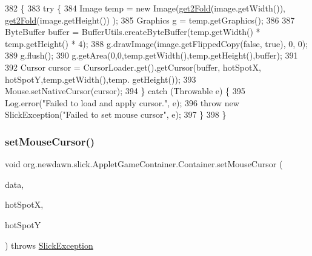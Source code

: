 \begin{DoxyCode}
382                                                                                                 \{
383           \textcolor{keywordflow}{try} \{
384              Image temp = \textcolor{keyword}{new} Image(\mbox{\hyperlink{classorg_1_1newdawn_1_1slick_1_1_applet_game_container_1_1_container_a012fbf7d500ad28d0dccfd9606f0cc1f}{get2Fold}}(image.getWidth()), \mbox{\hyperlink{classorg_1_1newdawn_1_1slick_1_1_applet_game_container_1_1_container_a012fbf7d500ad28d0dccfd9606f0cc1f}{get2Fold}}(image.getHeight())
      );
385              Graphics g = temp.getGraphics();
386              
387              ByteBuffer buffer = BufferUtils.createByteBuffer(temp.getWidth() * temp.getHeight() * 4);
388              g.drawImage(image.getFlippedCopy(\textcolor{keyword}{false}, \textcolor{keyword}{true}), 0, 0);
389              g.flush();
390              g.getArea(0,0,temp.getWidth(),temp.getHeight(),buffer);
391              
392              Cursor cursor = CursorLoader.get().getCursor(buffer, hotSpotX, hotSpotY,temp.getWidth(),temp.
      getHeight());
393              Mouse.setNativeCursor(cursor);
394           \} \textcolor{keywordflow}{catch} (Throwable e) \{
395              Log.error(\textcolor{stringliteral}{"Failed to load and apply cursor."}, e);
396              \textcolor{keywordflow}{throw} \textcolor{keyword}{new} SlickException(\textcolor{stringliteral}{"Failed to set mouse cursor"}, e);
397           \}
398        \}
\end{DoxyCode}
\mbox{\label{classorg_1_1newdawn_1_1slick_1_1_applet_game_container_1_1_container_abd30babb852ca4b6f04b7e83be1acadd}} 
\subsubsection{\texorpdfstring{set\+Mouse\+Cursor()}{setMouseCursor()}\hspace{0.1cm}{\footnotesize\ttfamily [3/4]}}
{\footnotesize\ttfamily void org.\+newdawn.\+slick.\+Applet\+Game\+Container.\+Container.\+set\+Mouse\+Cursor (\begin{DoxyParamCaption}\item[{\mbox{\hyperlink{interfaceorg_1_1newdawn_1_1slick_1_1opengl_1_1_image_data}{Image\+Data}}}]{data,  }\item[{int}]{hot\+SpotX,  }\item[{int}]{hot\+SpotY }\end{DoxyParamCaption}) throws \mbox{\hyperlink{classorg_1_1newdawn_1_1slick_1_1_slick_exception}{Slick\+Exception}}\hspace{0.3cm}{\ttfamily [inline]}}

